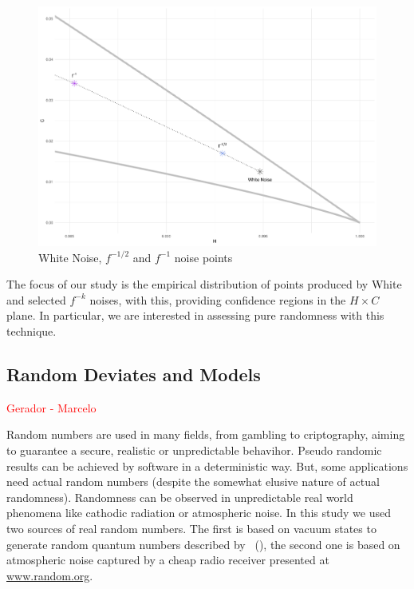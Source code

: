 \documentclass[sts]{imsart}
\begin{document}
\begin{figure}[hbt]
\centering
\includegraphics[width=\linewidth]{RightMostCorner}
\caption{White Noise, $f^{-1/2}$ and $f^{-1}$ noise points}\label{fig:RightMostCorner}
\end{figure}

The focus of our study is the empirical distribution of points produced by White and selected $f^{-k}$ noises, with this, providing confidence regions in the $H\times C$ plane.
In particular, we are interested in assessing pure randomness with this technique.

\subsection{Random Deviates and Models}

\textcolor{red}{Gerador - Marcelo}

Random numbers are used in many fields, from gambling to criptography, aiming to guarantee a secure, realistic or unpredictable behavihor. 
Pseudo randomic results can be achieved by software in a deterministic way. 
But, some applications need actual random numbers (despite the somewhat elusive nature of actual randomness).
Randomness can be observed in unpredictable real world phenomena like cathodic radiation or atmospheric noise.
In this study we used two sources of real random numbers. 
The first is based on vacuum states to generate random quantum numbers described by \citeauthor{RNGVacuumStates}~(\citeyear{RNGVacuumStates}), the second one is based on atmospheric noise captured by a cheap radio receiver presented at \url{www.random.org}.
\end{document}
